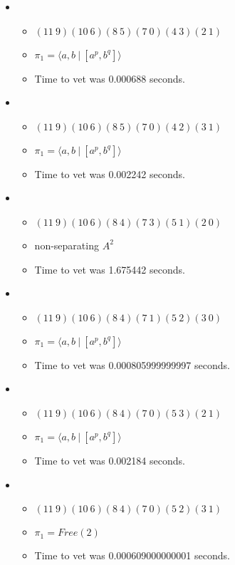 \documentclass{article}
\begin{document}
\begin{itemize}
\begin{itemize}
\end{itemize}
\item \begin{itemize}
      \item $(11\ 9)(10\ 6)(8\ 5)(7\ 0)(4\ 3)(2\ 1)$
      \item $\pi_1 = \langle a,b\ |\ [a^p,b^q]\rangle$
      \item Time to vet was 0.000688 seconds.
\end{itemize}
\item \begin{itemize}
      \item $(11\ 9)(10\ 6)(8\ 5)(7\ 0)(4\ 2)(3\ 1)$
      \item $\pi_1 = \langle a,b\ |\ [a^p,b^q]\rangle$
      \item Time to vet was 0.002242 seconds.
\end{itemize}
\item \begin{itemize}
      \item $(11\ 9)(10\ 6)(8\ 4)(7\ 3)(5\ 1)(2\ 0)$
      \item non-separating $A^2$
      \item Time to vet was 1.675442 seconds.
\end{itemize}
\item \begin{itemize}
      \item $(11\ 9)(10\ 6)(8\ 4)(7\ 1)(5\ 2)(3\ 0)$
      \item $\pi_1 = \langle a,b\ |\ [a^p,b^q]\rangle$
      \item Time to vet was 0.000805999999997 seconds.
\end{itemize}
\item \begin{itemize}
      \item $(11\ 9)(10\ 6)(8\ 4)(7\ 0)(5\ 3)(2\ 1)$
      \item $\pi_1 = \langle a,b\ |\ [a^p,b^q]\rangle$
      \item Time to vet was 0.002184 seconds.
\end{itemize}
\item \begin{itemize}
      \item $(11\ 9)(10\ 6)(8\ 4)(7\ 0)(5\ 2)(3\ 1)$
      \item $\pi_1 =Free(2)$
      \item Time to vet was 0.000609000000001 seconds.
\end{itemize}

\end{itemize}
\end{document}
